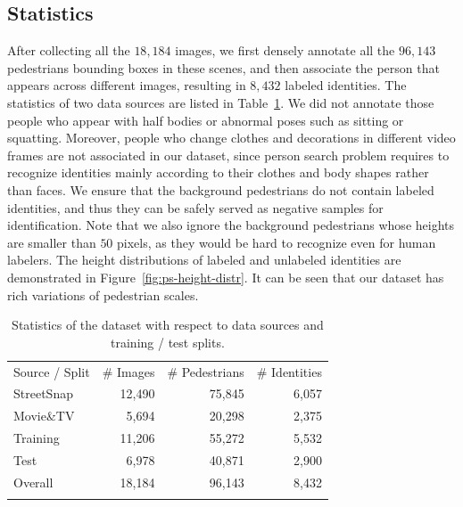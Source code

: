 \subsection{Statistics} %
\label{sub:ps-statistics}
After collecting all the $18,184$ images, we first densely annotate all the $96,143$ pedestrians bounding boxes in these scenes, and then associate the person that appears across different images, resulting in $8,432$ labeled identities. The statistics of two data sources are listed in Table~\ref{tab:ps-dataset-stats}. We did not annotate those people who appear with half bodies or abnormal poses such as sitting or squatting. Moreover, people who change clothes and decorations in different video frames are not associated in our dataset, since person search problem requires to recognize identities mainly according to their clothes and body shapes rather than faces. We ensure that the background pedestrians do not contain labeled identities, and thus they can be safely served as negative samples for identification. Note that we also ignore the background pedestrians whose heights are smaller than $50$ pixels, as they would be hard to recognize even for human labelers. The height distributions of labeled and unlabeled identities are demonstrated in Figure~\ref{fig:ps-height-distr}. It can be seen that our dataset has rich variations of pedestrian scales.
\begin{table}
\begin{center}
\begin{tabular}{lrrr}
\hline\noalign{\smallskip}
\noalign{\smallskip}
Source / Split & \# Images & \# Pedestrians & \# Identities \\
\noalign{\smallskip}\hline\hline\noalign{\smallskip}
StreetSnap & 12,490 & 75,845 & 6,057 \\
Movie\&TV & 5,694 & 20,298 & 2,375 \\
\hline\noalign{\smallskip}
Training & 11,206 & 55,272 & 5,532 \\
Test & 6,978 & 40,871 & 2,900 \\
\hline\noalign{\smallskip}
Overall & 18,184 & 96,143 & 8,432 \\
\hline\noalign{\smallskip}
\end{tabular}
\end{center}
\caption{Statistics of the dataset with respect to data sources and training / test splits.}
\label{tab:ps-dataset-stats}
\end{table}

